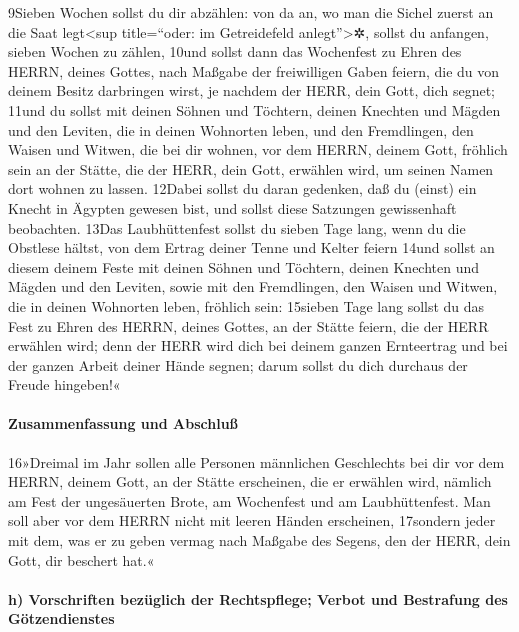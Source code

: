 9Sieben Wochen sollst du dir abzählen: von da an, wo man die Sichel
zuerst an die Saat legt\textless sup title=``oder: im Getreidefeld
anlegt''\textgreater✲, sollst du anfangen, sieben Wochen zu zählen,
10und sollst dann das Wochenfest zu Ehren des HERRN, deines Gottes, nach
Maßgabe der freiwilligen Gaben feiern, die du von deinem Besitz
darbringen wirst, je nachdem der HERR, dein Gott, dich segnet; 11und du
sollst mit deinen Söhnen und Töchtern, deinen Knechten und Mägden und
den Leviten, die in deinen Wohnorten leben, und den Fremdlingen, den
Waisen und Witwen, die bei dir wohnen, vor dem HERRN, deinem Gott,
fröhlich sein an der Stätte, die der HERR, dein Gott, erwählen wird, um
seinen Namen dort wohnen zu lassen. 12Dabei sollst du daran gedenken,
daß du (einst) ein Knecht in Ägypten gewesen bist, und sollst diese
Satzungen gewissenhaft beobachten. 13Das Laubhüttenfest sollst du sieben
Tage lang, wenn du die Obstlese hältst, von dem Ertrag deiner Tenne und
Kelter feiern 14und sollst an diesem deinem Feste mit deinen Söhnen und
Töchtern, deinen Knechten und Mägden und den Leviten, sowie mit den
Fremdlingen, den Waisen und Witwen, die in deinen Wohnorten leben,
fröhlich sein: 15sieben Tage lang sollst du das Fest zu Ehren des HERRN,
deines Gottes, an der Stätte feiern, die der HERR erwählen wird; denn
der HERR wird dich bei deinem ganzen Ernteertrag und bei der ganzen
Arbeit deiner Hände segnen; darum sollst du dich durchaus der Freude
hingeben!«

\hypertarget{zusammenfassung-und-abschluuxdf}{%
\paragraph{Zusammenfassung und
Abschluß}\label{zusammenfassung-und-abschluuxdf}}

16»Dreimal im Jahr sollen alle Personen männlichen Geschlechts bei dir
vor dem HERRN, deinem Gott, an der Stätte erscheinen, die er erwählen
wird, nämlich am Fest der ungesäuerten Brote, am Wochenfest und am
Laubhüttenfest. Man soll aber vor dem HERRN nicht mit leeren Händen
erscheinen, 17sondern jeder mit dem, was er zu geben vermag nach Maßgabe
des Segens, den der HERR, dein Gott, dir beschert hat.«

\hypertarget{h-vorschriften-bezuxfcglich-der-rechtspflege-verbot-und-bestrafung-des-guxf6tzendienstes}{%
\paragraph{h) Vorschriften bezüglich der Rechtspflege; Verbot und
Bestrafung des
Götzendienstes}\label{h-vorschriften-bezuxfcglich-der-rechtspflege-verbot-und-bestrafung-des-guxf6tzendienstes}}

